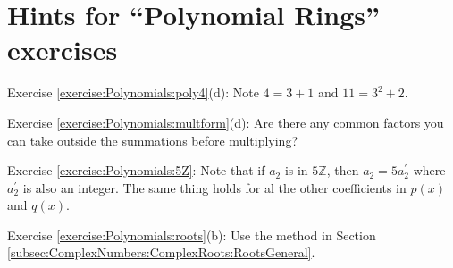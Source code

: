 \section{Hints for ``Polynomial Rings'' exercises}
\label{sec:Polynomials:Hints} 

\noindent Exercise \ref{exercise:Polynomials:poly4}(d):  Note $4=3+1$ and $11=3^2+2$.

\noindent Exercise \ref{exercise:Polynomials:multform}(d): Are there any common factors you can take outside 
the summations before multiplying?

\noindent Exercise \ref{exercise:Polynomials:5Z}:  Note that if  $a_2$ is in $5\mathbb{Z}$, then $a_2 = 5a_2^{\prime}$ where $a_2^{\prime}$ is also an integer.
The same thing holds for al the other coefficients in $p(x)$ and $q(x)$.

\noindent Exercise \ref{exercise:Polynomials:roots}(b):  Use the method in Section \ref{subsec:ComplexNumbers:ComplexRoots:RootsGeneral}.
 